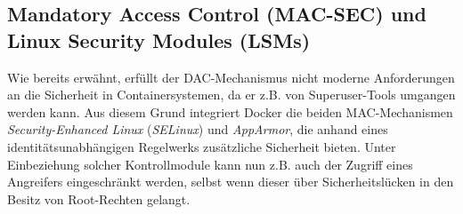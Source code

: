 \documentclass[../main.tex]{subfiles}
\begin{document}





    \subsection{Mandatory Access Control (\acrshort{MAC-SEC}) und Linux Security Modules (\acrshort{LSM}s)}
			Wie bereits erwähnt, erfüllt der DAC-Mechanismus nicht moderne Anforderungen an die Sicherheit in Containersystemen, da er z.B. von Superuser-Tools umgangen werden kann. Aus diesem Grund integriert Docker die beiden MAC-Mechanismen \emph{Security-Enhanced Linux} (\emph{SELinux}) und \emph{AppArmor}, die anhand eines identitätsunabhängigen Regelwerks zusätzliche Sicherheit bieten. Unter Einbeziehung solcher Kontrollmodule kann nun z.B. auch der Zugriff eines Angreifers eingeschränkt werden, selbst wenn dieser über Sicherheitslücken in den Besitz von Root-Rechten gelangt.
\end{document}
